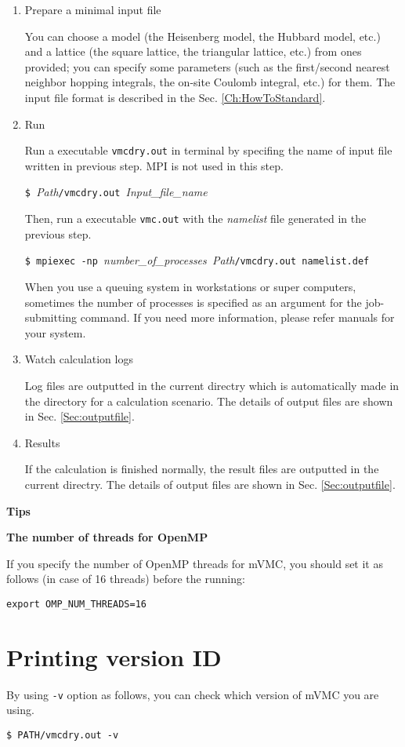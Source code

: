 \begin{enumerate}

\item  Prepare a minimal input file

You can choose a model (the Heisenberg model, the Hubbard model, etc.) and 
a lattice (the square lattice, the triangular lattice, etc.) from ones provided;
you can specify some parameters (such as the first/second nearest neighbor hopping integrals,
the on-site Coulomb integral, etc.) for them.
The input file format is described in the Sec. \ref{Ch:HowToStandard}.

\item  Run

Run a executable \verb|vmcdry.out| in terminal by specifing
the name of input file written in previous step.
MPI is not used in this step.

\verb|$ |\textit{Path}\verb|/vmcdry.out |\textit{Input\_file\_name}

Then, run a executable \verb|vmc.out| with 
the {\it namelist} file generated in the previous step.

\verb|$ mpiexec -np |\textit{number\_of\_processes}\verb| |\textit{Path}\verb|/vmcdry.out namelist.def|

When you use a queuing system in workstations or super computers, 
sometimes the number of processes is specified as an argument for the job-submitting command.
If you need more information, please refer manuals for your system. 

\item Watch calculation logs

Log files are outputted in the current directry which is automatically made in the directory for a calculation scenario.
The details of output files are shown in Sec. \ref{Sec:outputfile}.

\item Results

  If the calculation is finished normally, the result files are outputted in  the current directry.
  The details of output files are shown in Sec. \ref{Sec:outputfile}.

\end{enumerate}

\begin{screen}
\Large 
{\bf Tips}
\normalsize

{\bf The number of threads for OpenMP}

If you specify the number of OpenMP threads for mVMC,
you should set it as follows (in case of 16 threads) before the running:
\begin{verbatim}
export OMP_NUM_THREADS=16
\end{verbatim}

\end{screen}

\section{Printing version ID}

By using \verb|-v| option as follows, 
you can check which version of mVMC you are using.

\begin{verbatim}
$ PATH/vmcdry.out -v
\end{verbatim}
